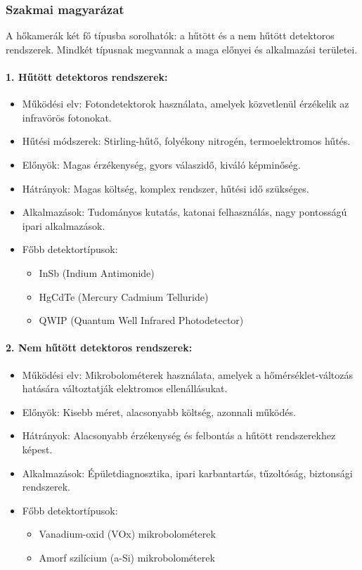 \documentclass[a4paper,12pt]{article}
\begin{document}
\subsubsection{Szakmai magyarázat} A hőkamerák két fő típusba sorolhatók: a hűtött és a nem hűtött detektoros rendszerek. Mindkét típusnak megvannak a maga előnyei és alkalmazási területei.

\paragraph{1. Hűtött detektoros rendszerek:} \begin{itemize} \item Működési elv: Fotondetektorok használata, amelyek közvetlenül érzékelik az infravörös fotonokat. \item Hűtési módszerek: Stirling-hűtő, folyékony nitrogén, termoelektromos hűtés. \item Előnyök: Magas érzékenység, gyors válaszidő, kiváló képminőség. \item Hátrányok: Magas költség, komplex rendszer, hűtési idő szükséges. \item Alkalmazások: Tudományos kutatás, katonai felhasználás, nagy pontosságú ipari alkalmazások. \item Főbb detektortípusok: \begin{itemize} \item InSb (Indium Antimonide) \item HgCdTe (Mercury Cadmium Telluride) \item QWIP (Quantum Well Infrared Photodetector) \end{itemize} \end{itemize}

\paragraph{2. Nem hűtött detektoros rendszerek:} \begin{itemize} \item Működési elv: Mikrobolométerek használata, amelyek a hőmérséklet-változás hatására változtatják elektromos ellenállásukat. \item Előnyök: Kisebb méret, alacsonyabb költség, azonnali működés. \item Hátrányok: Alacsonyabb érzékenység és felbontás a hűtött rendszerekhez képest. \item Alkalmazások: Épületdiagnosztika, ipari karbantartás, tűzoltóság, biztonsági rendszerek. \item Főbb detektortípusok: \begin{itemize} \item Vanadium-oxid (VOx) mikrobolométerek \item Amorf szilícium (a-Si) mikrobolométerek \end{itemize} \end{itemize}
\end{document}
